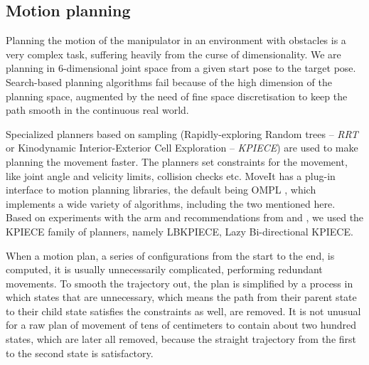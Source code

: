 \documentclass[buriama8_dp.tex]{subfiles}
\begin{document}
\subsection{Motion planning}
\label{subsec:motion_planning}

Planning the motion of the manipulator in an environment with obstacles is a very complex task, suffering heavily from the curse of dimensionality. We are planning in 6-dimensional joint space from a given start pose to the target pose. Search-based planning algorithms fail because of the high dimension of the planning space, augmented by the need of fine space discretisation to keep the path smooth in the continuous real world.

Specialized planners based on sampling (Rapidly-exploring Random trees -- \emph{RRT} \cite{rrt}  or Kinodynamic Interior-Exterior Cell Exploration -- \emph{KPIECE}) are used to make planning the movement faster. The planners set constraints for the movement, like joint angle and velicity limits, collision checks etc. MoveIt has a plug-in interface to motion planning libraries, the default being OMPL \cite{ompl}, which implements a wide variety of algorithms, including the two mentioned here. Based on experiments with the arm and recommendations from \cite{vojta} and \cite{ompl}, we used the KPIECE family of planners, namely LBKPIECE, Lazy Bi-directional KPIECE.



When a motion plan, a series of configurations from the start to the end, is computed, it is usually unnecessarily complicated, performing redundant movements. To smooth the trajectory out, the plan is simplified by a process in which states that are unnecessary, which means the path from their parent state to their child state satisfies the constraints as well, are removed. It is not unusual for a raw plan of movement of tens of centimeters to contain about two hundred states, which are later all removed, because the straight trajectory from the first to the second state is satisfactory.
\end{document}
